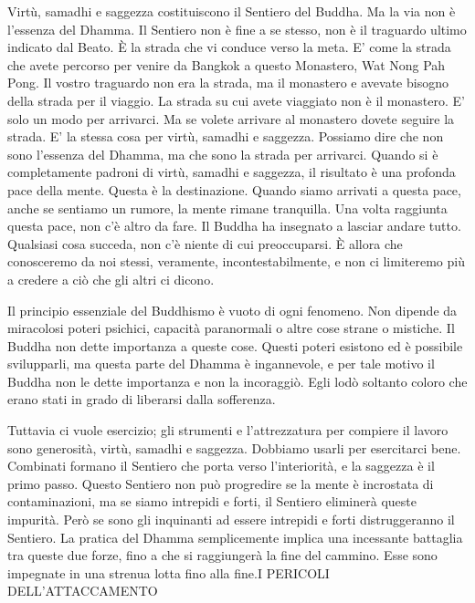 Virtù, samadhi e saggezza costituiscono il Sentiero del Buddha. Ma la
via non è l'essenza del Dhamma. Il Sentiero non è fine a se stesso, non
è il traguardo ultimo indicato dal Beato. È la strada che vi conduce
verso la meta. E' come la strada che avete percorso per venire da
Bangkok a questo Monastero, Wat Nong Pah Pong. Il vostro traguardo non
era la strada, ma il monastero e avevate bisogno della strada per il
viaggio. La strada su cui avete viaggiato non è il monastero. E' solo un
modo per arrivarci. Ma se volete arrivare al monastero dovete seguire la
strada. E' la stessa cosa per virtù, samadhi e saggezza. Possiamo dire
che non sono l'essenza del Dhamma, ma che sono la strada per arrivarci.
Quando si è completamente padroni di virtù, samadhi e saggezza, il
risultato è una profonda pace della mente. Questa è la destinazione.
Quando siamo arrivati a questa pace, anche se sentiamo un rumore, la
mente rimane tranquilla. Una volta raggiunta questa pace, non c'è altro
da fare. Il Buddha ha insegnato a lasciar andare tutto. Qualsiasi cosa
succeda, non c'è niente di cui preoccuparsi. È allora che conosceremo da
noi stessi, veramente, incontestabilmente, e non ci limiteremo più a
credere a ciò che gli altri ci dicono.

Il principio essenziale del Buddhismo è vuoto di ogni fenomeno. Non
dipende da miracolosi poteri psichici, capacità paranormali o altre cose
strane o mistiche. Il Buddha non dette importanza a queste cose. Questi
poteri esistono ed è possibile svilupparli, ma questa parte del Dhamma è
ingannevole, e per tale motivo il Buddha non le dette importanza e non
la incoraggiò. Egli lodò soltanto coloro che erano stati in grado di
liberarsi dalla sofferenza.

Tuttavia ci vuole esercizio; gli strumenti e l'attrezzatura per compiere
il lavoro sono generosità, virtù, samadhi e saggezza. Dobbiamo usarli
per esercitarci bene. Combinati formano il Sentiero che porta verso
l'interiorità, e la saggezza è il primo passo. Questo Sentiero non può
progredire se la mente è incrostata di contaminazioni, ma se siamo
intrepidi e forti, il Sentiero eliminerà queste impurità. Però se sono
gli inquinanti ad essere intrepidi e forti distruggeranno il Sentiero.
La pratica del Dhamma semplicemente implica una incessante battaglia tra
queste due forze, fino a che si raggiungerà la fine del cammino. Esse
sono impegnate in una strenua lotta fino alla fine.I PERICOLI
DELL'ATTACCAMENTO

